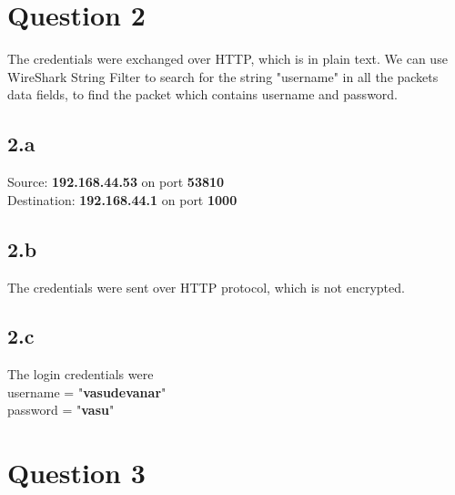 \documentclass{article}
\begin{document}
\pagebreak
\section*{Question 2}
\vspace{10pt}

The credentials were exchanged over HTTP, which is in plain text. We can use WireShark String Filter to search for the string "username" in all the packets data fields, to find the packet which contains username and password.

\subsection*{2.a}
Source: \textbf{192.168.44.53} on port \textbf{53810} \\
Destination: \textbf{192.168.44.1} on port \textbf{1000}

\subsection*{2.b}
The credentials were sent over HTTP protocol, which is not encrypted.

\subsection*{2.c}
The login credentials were \\

\indent username = "\textbf{vasudevanar}" \\
\indent password = "\textbf{vasu}" 




\pagebreak
\section*{Question 3}
\vspace{10pt}
\end{document}
